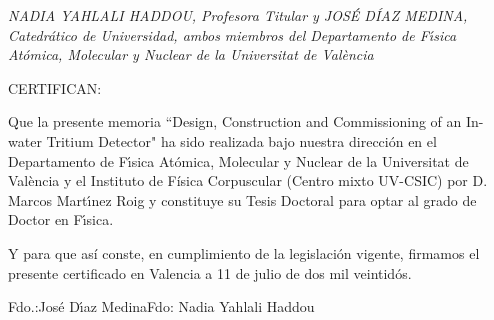 

{\sl    NADIA YAHLALI HADDOU, Profesora Titular  y JOS\'E D\'IAZ MEDINA, Catedrático de  Universidad, ambos
miembros del Departamento de F\'{\i}sica At\'omica, Molecular y Nuclear
de la Universitat de València
\vspace{0.5cm}

        CERTIFICAN:
\vspace{0.7cm}

        Que la presente memoria ``Design, Construction and Commissioning of an In-water Tritium Detector"
ha sido realizada bajo nuestra direcci\'on en
el Departamento de F\'{\i}sica At\'omica, Molecular y Nuclear de la 
Universitat
de València y el Instituto de Física Corpuscular (Centro mixto UV-CSIC)  por D. Marcos Mart\'{\i}nez Roig y constituye su Tesis 
Doctoral para optar al grado de Doctor en F\'{\i}sica.
\vspace{1.cm}

        Y para que así conste, en cumplimiento de la legislaci\'on vigente, firmamos
el presente certificado en Valencia a 11 de julio de dos mil veintidós.}
\vspace{1.cm}
\begin{center}
Fdo.:Jos\'e D\'{\i}az Medina\hfill Fdo: Nadia Yahlali Haddou
\end{center}